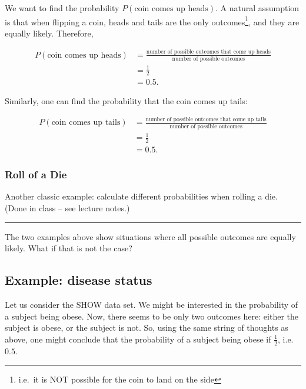 \documentclass[]{book}
\let\rmarkdownfootnote\footnote%
\def\footnote{\protect\rmarkdownfootnote}
\theoremstyle{definition}
\theoremstyle{definition}
\theoremstyle{definition}
\theoremstyle{remark}
\begin{document}
We want to find the probability \(P(\text{coin comes up heads})\). A natural assumption is that when flipping a coin, heads and tails are the only outcomes\footnote{i.e.~it is NOT possible for the coin to land on the side}, and they are equally likely. Therefore,

\begin{align*}
  P(\text{coin comes up heads}) &= \frac{\text{number of possible outcomes that come up heads}}{\text{number of possible outcomes}} \\
  &= \frac{1}{2} \\
  &= 0.5.
\end{align*}

Similarly, one can find the probability that the coin comes up tails:

\begin{align}
  P(\text{coin comes up tails}) &= \frac{\text{number of possible outcomes that come up tails}}{\text{number of possible outcomes}} \\
  &= \frac{1}{2} \\
  &= 0.5.
\end{align}

\hypertarget{roll-of-a-die}{%
\subsubsection{Roll of a Die}\label{roll-of-a-die}}

Another classic example: calculate different probabilities when rolling a die. (Done in class -- see lecture notes.)

\begin{center}\rule{0.5\linewidth}{\linethickness}\end{center}

The two examples above show situations where all possible outcomes are equally likely. What if that is not the case?

\hypertarget{example-disease-status}{%
\subsection{Example: disease status}\label{example-disease-status}}

Let us consider the SHOW data set. We might be interested in the probability of a subject being obese. Now, there seems to be only two outcomes here: either the subject is obese, or the subject is not. So, using the same string of thoughts as above, one might conclude that the probability of a subject being obese if \(\frac{1}{2}\), i.e.~\(0.5\).
\end{document}

